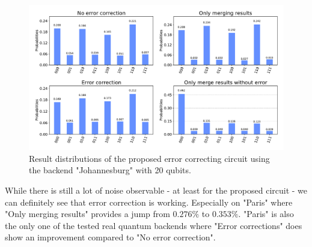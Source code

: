 \begin{figure}[H]
    \centering
    \includegraphics[width=\textwidth]{res/test-histogram-qec-results-johannesburg.pdf}
    \caption{Result distributions of the proposed error correcting circuit using the backend "Johannesburg" with 20 qubits.}
    \label{fig:test-histogram-qec-results-johannesburg}
\end{figure}

While there is still a lot of noise observable - at least for the proposed circuit - we can definitely see that error correction is working.
Especially on "Paris" where "Only merging results" provides a jump from \(0.276 \%\) to \(0.353 \%\).
"Paris" is also the only one of the tested real quantum backends where "Error corrections" does show an improvement compared to "No error correction".
